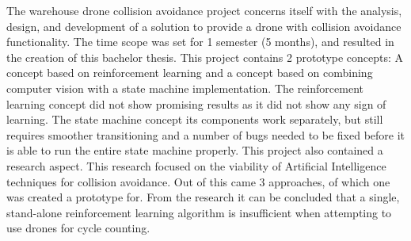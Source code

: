 \noindent
The warehouse drone collision avoidance project concerns itself with the analysis, design, and development of a solution to provide a drone with collision avoidance functionality. The time scope was set for 1 semester (5 months), and resulted in the creation of this bachelor thesis. This project contains 2 prototype concepts: A concept based on reinforcement learning and a concept based on combining computer vision with a state machine implementation. The reinforcement learning concept did not show promising results as it did not show any sign of learning. The state machine concept its components work separately, but still requires smoother transitioning and a number of bugs needed to be fixed before it is able to run the entire state machine properly. This project also contained a research aspect. This research focused on the viability of Artificial Intelligence techniques for collision avoidance. Out of this came 3 approaches, of which one was created a prototype for. From the research it can be concluded that a single, stand-alone reinforcement learning algorithm is insufficient when attempting to use drones for cycle counting.